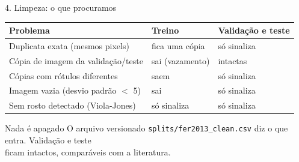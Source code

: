 \documentclass[aspectratio=169,t,xcolor=table]{beamer}
\newcommand{\code}[1]{\texttt{#1}}
\begin{document}
\begin{frame}{4. Limpeza: o que procuramos}

    \begin{table}[]
        \centering
        \footnotesize
        \renewcommand{\arraystretch}{1.25}
        \setlength{\tabcolsep}{7pt}
        {
            \begin{tabular}{>{\raggedright\arraybackslash}p{4.9cm}>{\raggedright\arraybackslash}p{2.6cm}>{\raggedright\arraybackslash}p{2.9cm}}
                \toprule
                \textbf{Problema}                          & \textbf{Treino}       & \textbf{Validação e teste} \\
                \midrule
                Duplicata exata (mesmos pixels)            & fica uma cópia        & só sinaliza                \\
                Cópia de imagem da validação/teste         & sai (vazamento)       & intactas                   \\
                Cópias com rótulos diferentes              & saem                  & só sinaliza                \\
                Imagem vazia (desvio padrão $<$ 5)         & sai                   & só sinaliza                \\
                Sem rosto detectado (Viola-Jones)          & só sinaliza           & só sinaliza                \\
                \bottomrule
            \end{tabular}
        }
    \end{table}

    \begin{block}{Nada é apagado}
        O arquivo versionado \code{splits/fer2013\_clean.csv} diz o que entra. Validação e teste\\
        ficam intactos, comparáveis com a literatura.
    \end{block}\par
    \vspace{\fill}

\end{frame}
\end{document}
